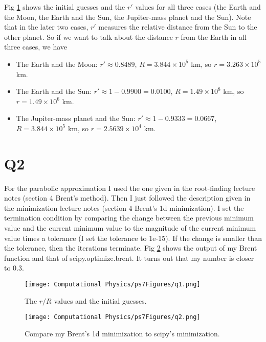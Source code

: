 \documentclass[11pt]{article}
\begin{document}
\begin{enumerate}[label=(\alph*)]
    Fig \ref{fig:Q1} shows the initial guesses and the $r'$ values for all three cases (the Earth and the Moon, the Earth and the Sun, the Jupiter-mass planet and the Sun). Note that in the later two cases, $r'$ measures the relative distance from the Sun to the other planet. So if we want to talk about the distance $r$ from the Earth in all three cases, we have
    \begin{itemize}
        \item The Earth and the Moon: $r'\approx0.8489$, $R=3.844\times 10^5$ km, so $r=3.263\times 10^5$ km.
        \item The Earth and the Sun: $r'\approx1-0.9900=0.0100$, $R=1.49\times 10^8$ km, so $r=1.49\times 10^6$ km.
        \item The Jupiter-mass planet and the Sun: $r'\approx1-0.9333=0.0667$, $R=3.844\times 10^5$ km, so $r=2.5639\times 10^4$ km.
    \end{itemize}
\end{enumerate}

\section*{Q2}
For the parabolic approximation I used the one given in the root-finding lecture notes (section 4 Brent's method). Then I just followed the description given in the minimization lecture notes (section 4 Brent's 1d minimization). I set the termination condition by comparing the change between the previous minimum value and the current minimum value to the magnitude of the current minimum value times a tolerance (I set the tolerance to 1e-15). If the change is smaller than the tolerance, then the iterations terminate. Fig \ref{fig:Q2} shows the output of my Brent function and that of scipy.optimize.brent. It turns out that my number is closer to 0.3.

\begin{figure}[b!]
\centering
\texttt{[image: Computational Physics/ps7Figures/q1.png]}
\caption{The $r/R$ values and the initial guesses.}
  \label{fig:Q1}
\end{figure}

\begin{figure}[b!]
\centering
\texttt{[image: Computational Physics/ps7Figures/q2.png]}
\caption{Compare my Brent's 1d minimization to scipy's minimization.}
  \label{fig:Q2}
\end{figure}




\end{document}
